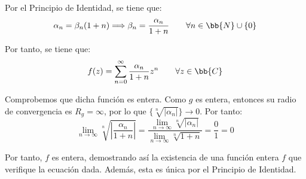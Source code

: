 \documentclass[12pt]{article}
\begin{document}
\begin{ejercicio}[3.5 puntos]
        Por el Principio de Identidad, se tiene que:
        \begin{equation*}
            \alpha_n = \beta_n(1+n)\Longrightarrow \beta_n = \frac{\alpha_n}{1+n} \qquad \forall n\in\bb{N}\cup \{0\}
        \end{equation*}

        Por tanto, se tiene que:
        \begin{equation*}
            f(z) = \sum_{n=0}^{\infty} \frac{\alpha_n}{1+n} z^n \qquad \forall z\in\bb{C}
        \end{equation*}

        Comprobemos que dicha función es entera. Como $g$ es entera, entonces su radio de convergencia es $R_g=\infty$, por lo que $\{\sqrt[n]{|\alpha_n|}\}\to 0$. Por tanto:
        \begin{equation*}
            \lim_{n\to\infty} \sqrt[n]{\left|\frac{\alpha_n}{1+n}\right|} = \dfrac{\lim\limits_{n\to\infty} \sqrt[n]{|\alpha_n|}}{\lim\limits_{n\to\infty} \sqrt[n]{1+n}} = \dfrac{0}{1} = 0
        \end{equation*}

        Por tanto, $f$ es entera, demostrando así la existencia de una función entera $f$ que verifique la ecuación dada. Además, esta es única por el Principio de Identidad.
    \end{ejercicio}
\end{document}
